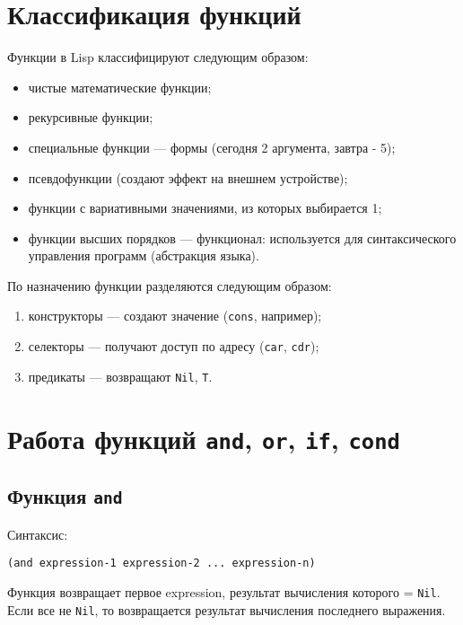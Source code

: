 \section{Классификация функций}

Функции в Lisp классифицируют следующим образом:

\begin{itemize}
    \item чистые математические функции;
    \item рекурсивные функции;
    \item специальные функции --- формы (сегодня 2 аргумента, завтра - 5);
    \item псевдофункции (создают эффект на внешнем устройстве);
    \item функции с вариативными значениями, из которых выбирается 1;
    \item функции высших порядков --- функционал: используется для синтаксического управления программ (абстракция языка).
\end{itemize}

По назначению функции разделяются следующим образом:

\begin{enumerate}
    \item конструкторы --- создают значение (\texttt{cons}, например);
    \item селекторы --- получают доступ по адресу (\texttt{car}, \texttt{cdr});
    \item предикаты --- возвращают \texttt{Nil}, \texttt{T}.
\end{enumerate}

\section{Работа функций \texttt{and}, \texttt{or}, \texttt{if}, \texttt{cond}}

\subsection{Функция \texttt{and}}

Синтаксис:
\begin{lstlisting}
(and expression-1 expression-2 ... expression-n)
\end{lstlisting}

Функция возвращает первое expression, результат вычисления которого = \texttt{Nil}. Если все не \texttt{Nil}, то возвращается результат вычисления последнего выражения.

